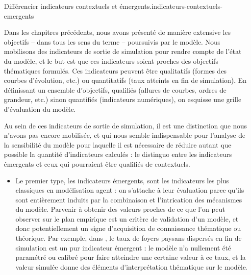 \bigskip 
\begin{encadre}{Différencier indicateurs contextuels et émergents.}{indicateurs-contextuels-emergents}
		\renewcommand{\thempfootnote}{\alph{mpfootnote}}
	
Dans les chapitres précédents, nous avons présenté de manière extensive les objectifs -- dans tous les sens du terme -- poursuivis par le modèle.
Nous mobilisons des indicateurs de sortie de simulation pour rendre compte de l'état du modèle, et le but est que ces indicateurs soient proches des objectifs thématiques formulés.
Ces indicateurs peuvent être qualitatifs (formes des courbes d'évolution, etc.) ou quantitatifs (taux atteints en fin de simulation).
En définissant un ensemble d'objectifs, qualifiés (allures de courbes, ordres de grandeur, etc.) sinon quantifiés (indicateurs numériques), on esquisse une grille d'évaluation du modèle.

Au sein de ces indicateurs de sortie de simulation, il est une distinction que nous n'avons pas encore mobilisée, et qui nous semble indispensable pour l'analyse de la sensibilité du modèle pour laquelle il est nécessaire de réduire autant que possible la quantité d'indicateurs calculés : le distinguo entre les indicateurs \og émergents\fg{} et ceux qui pourraient être qualifiés de \og contextuels\fg{}.

\begin{itemize}
	\item Le premier type, les indicateurs émergents, sont les indicateurs les plus classiques en modélisation agent : on s'attache à leur évaluation parce qu'ils sont entièrement induits par la combinaison et l'intrication des mécanismes du modèle.
	Parvenir à obtenir des valeurs proches de ce que l'on peut observer sur le plan empirique est un critère de validation d'un modèle, et donc potentiellement un signe d'acquisition de connaissance thématique ou théorique.
	Par exemple, dans \simfeodal{}, le taux de foyers paysans dispersés en fin de simulation est un pur indicateur émergent : le modèle n'a nullement été paramétré ou calibré pour faire atteindre une certaine valeur à ce taux, et la valeur simulée donne des éléments d'interprétation thématique sur le modèle.
	

\end{itemize}
\end{encadre}
